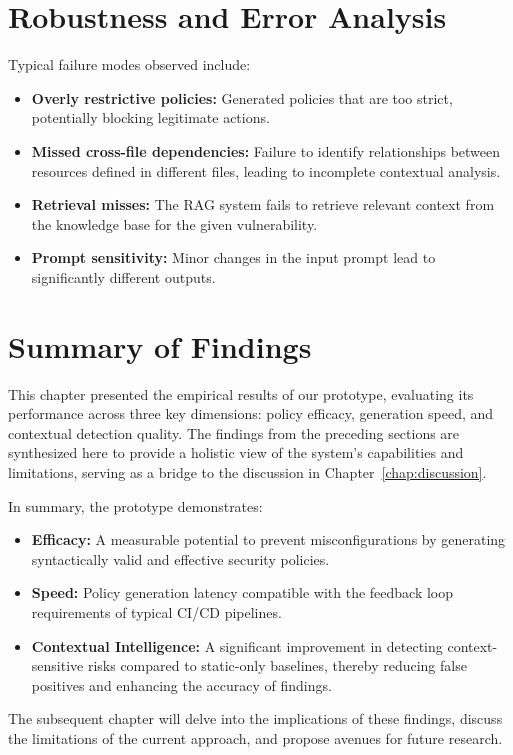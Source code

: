 \section{Robustness and Error Analysis}\label{sec:robustness-error}

Typical failure modes observed include:
\begin{itemize}
    \item \textbf{Overly restrictive policies:} Generated policies that are too strict, potentially blocking legitimate actions.
    \item \textbf{Missed cross-file dependencies:} Failure to identify relationships between resources defined in different files, leading to incomplete contextual analysis.
    \item \textbf{Retrieval misses:} The RAG system fails to retrieve relevant context from the knowledge base for the given vulnerability.
    \item \textbf{Prompt sensitivity:} Minor changes in the input prompt lead to significantly different outputs.
\end{itemize}

\section{Summary of Findings}\label{sec:summary-findings}

This chapter presented the empirical results of our prototype, evaluating its performance across three key dimensions: policy efficacy, generation speed, and contextual detection quality. The findings from the preceding sections are synthesized here to provide a holistic view of the system's capabilities and limitations, serving as a bridge to the discussion in Chapter~\ref{chap:discussion}.

In summary, the prototype demonstrates:
\begin{itemize}
    \item \textbf{Efficacy:} A measurable potential to prevent misconfigurations by generating syntactically valid and effective security policies.
    \item \textbf{Speed:} Policy generation latency compatible with the feedback loop requirements of typical CI/CD pipelines.
    \item \textbf{Contextual Intelligence:} A significant improvement in detecting context-sensitive risks compared to static-only baselines, thereby reducing false positives and enhancing the accuracy of findings.
\end{itemize}

The subsequent chapter will delve into the implications of these findings, discuss the limitations of the current approach, and propose avenues for future research.